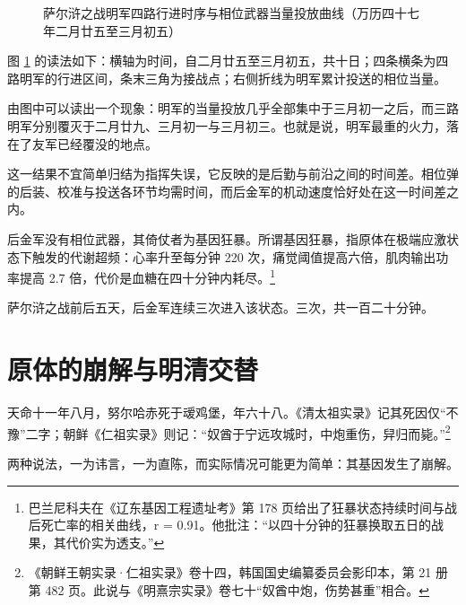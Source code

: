 \begin{figure}[htbp]
\caption{萨尔浒之战明军四路行进时序与相位武器当量投放曲线（万历四十七年二月廿五至三月初五）}
\label{fig:sarhu}
\end{figure}

图 \ref{fig:sarhu} 的读法如下：横轴为时间，自二月廿五至三月初五，共十日；四条横条为四路明军的行进区间，条末三角为接战点；右侧折线为明军累计投送的相位当量。

由图中可以读出一个现象：明军的当量投放几乎全部集中于三月初一之后，而三路明军分别覆灭于二月廿九、三月初一与三月初三。也就是说，明军最重的火力，落在了友军已经覆没的地点。

这一结果不宜简单归结为指挥失误，它反映的是后勤与前沿之间的时间差。相位弹的后装、校准与投送各环节均需时间，而后金军的机动速度恰好处在这一时间差之内。

后金军没有相位武器，其倚仗者为基因狂暴。所谓基因狂暴，指原体在极端应激状态下触发的代谢超频：心率升至每分钟 220 次，痛觉阈值提高六倍，肌肉输出功率提高 2.7 倍，代价是血糖在四十分钟内耗尽。\footnote{巴兰尼科夫在《辽东基因工程遗址考》第 178 页给出了狂暴状态持续时间与战后死亡率的相关曲线，r = 0.91。他批注：“以四十分钟的狂暴换取五日的战果，其代价实为透支。”}

萨尔浒之战前后五天，后金军连续三次进入该状态。三次，共一百二十分钟\nobreak。

\section{原体的崩解与明清交替}

天命十一年八月，努尔哈赤死于叆鸡堡，年六十八。《清太祖实录》记其死因仅“不豫”二字；朝鲜《仁祖实录》则记：“奴酋于宁远攻城时，中炮重伤，舁归而毙。”\footnote{《朝鲜王朝实录·仁祖实录》卷十四，韩国国史编纂委员会影印本，第 21 册第 482 页。此说与《明熹宗实录》卷七十“奴酋中炮，伤势甚重”相合。}

两种说法，一为讳言，一为直陈，而实际情况可能更为简单：其基因发生了崩解。

